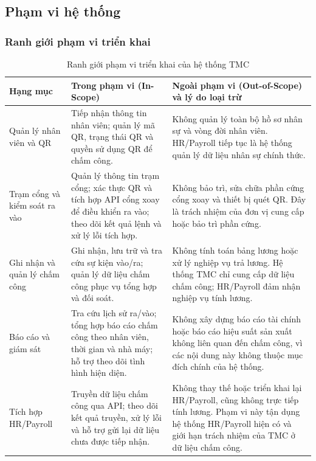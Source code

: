 \subsection{Phạm vi hệ thống}
\subsubsection{Ranh giới phạm vi triển khai}

\begingroup
\small
\renewcommand{\arraystretch}{1.2}
\begin{longtable}{|>{\raggedright\arraybackslash}m{2.8cm}|>{\raggedright\arraybackslash}m{6.1cm}|>{\raggedright\arraybackslash}m{6.3cm}|}
    \caption{Ranh giới phạm vi triển khai của hệ thống TMC}\label{tab:tmc-scope}\\
    \hline
    \textbf{Hạng mục} & \textbf{Trong phạm vi (In-Scope)} & \textbf{Ngoài phạm vi (Out-of-Scope) và lý do loại trừ}\\
    \hline
    Quản lý nhân viên và QR & Tiếp nhận thông tin nhân viên; quản lý mã QR, trạng thái QR và quyền sử dụng QR để chấm công. & Không quản lý toàn bộ hồ sơ nhân sự và vòng đời nhân viên. HR/Payroll tiếp tục là hệ thống quản lý dữ liệu nhân sự chính thức.\\
    \hline
    Trạm cổng và kiểm soát ra vào & Quản lý thông tin trạm cổng; xác thực QR và tích hợp API cổng xoay để điều khiển ra vào; theo dõi kết quả lệnh và xử lý lỗi tích hợp. & Không bảo trì, sửa chữa phần cứng cổng xoay và thiết bị quét QR. Đây là trách nhiệm của đơn vị cung cấp hoặc bảo trì phần cứng.\\
    \hline
    Ghi nhận và quản lý chấm công & Ghi nhận, lưu trữ và tra cứu sự kiện vào/ra; quản lý dữ liệu chấm công phục vụ tổng hợp và đối soát. & Không tính toán bảng lương hoặc xử lý nghiệp vụ trả lương. Hệ thống TMC chỉ cung cấp dữ liệu chấm công; HR/Payroll đảm nhận nghiệp vụ tính lương.\\
    \hline
    Báo cáo và giám sát & Tra cứu lịch sử ra/vào; tổng hợp báo cáo chấm công theo nhân viên, thời gian và nhà máy; hỗ trợ theo dõi tình hình hiện diện. & Không xây dựng báo cáo tài chính hoặc báo cáo hiệu suất sản xuất không liên quan đến chấm công, vì các nội dung này không thuộc mục đích chính của hệ thống.\\
    \hline
    Tích hợp HR/Payroll & Truyền dữ liệu chấm công qua API; theo dõi kết quả truyền, xử lý lỗi và hỗ trợ gửi lại dữ liệu chưa được tiếp nhận. & Không thay thế hoặc triển khai lại HR/Payroll, cũng không trực tiếp tính lương. Phạm vi này tận dụng hệ thống HR/Payroll hiện có và giới hạn trách nhiệm của TMC ở dữ liệu chấm công.\\

\end{longtable}
